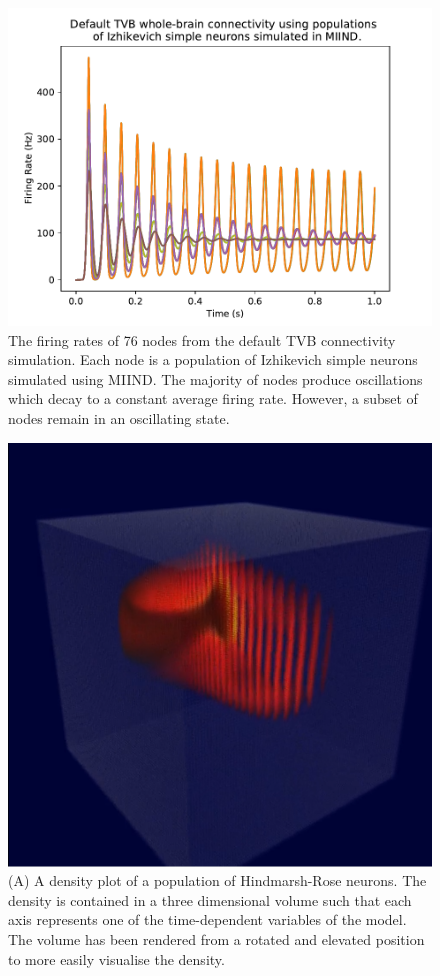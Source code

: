 \documentclass[utf8]{frontiersSCNS} %
\begin{document}
\begin{figure}[!htb]
  \centering
  \includegraphics[width=0.7\columnwidth]{images/tvb_miind.pdf}
  \caption{The firing rates of 76 nodes from the default TVB connectivity simulation. Each node is a population of Izhikevich simple neurons simulated using MIIND. The majority of nodes produce oscillations which decay to a constant average firing rate. However, a subset of nodes remain in an oscillating state. }
  \label{fig:tvbmiind}
\end{figure}

\begin{figure}[!htb]
  \centering
  \includegraphics[width=0.7\columnwidth]{images/hindmarsh-rose.png}
  \caption{(A) A density plot of a population of Hindmarsh-Rose neurons. The density is contained in a three dimensional volume such that each axis represents one of the time-dependent variables of the model. The volume has been rendered from a rotated and elevated position to more easily visualise the density.}
  \label{fig:hindmarshrose}
\end{figure}

\end{document}
